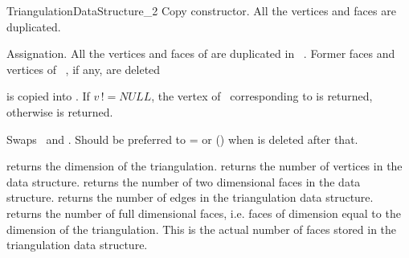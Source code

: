 \begin{ccRefConcept}{TriangulationDataStructure_2}
{Copy constructor. All the vertices and faces are duplicated.}

{Assignation. All the vertices and faces of  are duplicated
in \ccVar\ . Former faces and vertices of \ccVar\ , if any, are
deleted}


{ is copied into \ccVar. If $v\, !\!= NULL$, the vertex of \ccVar\ 
corresponding to  is returned, otherwise  
is returned.
}

{Swaps \ccVar\ and . Should be preferred to \ccVar= or \ccVar(\ccc{tds1})
when \ccc{tds1} is deleted after that.}

\ccAccessFunctions
{}
{returns the dimension of the triangulation.}
\ccGlue
{}
{returns the number of vertices in the data structure.}
\ccGlue
{}
{returns the number of two dimensional faces in the data structure.}
\ccGlue
{}
{returns the number of edges  in the triangulation data structure.}
\ccGlue
{}
{returns the  number of full dimensional faces, 
i.e. faces of dimension equal to the dimension
of the triangulation. This is the actual
number of faces stored in the triangulation data structure.}

\begin{ccAdvanced}
\end{ccAdvanced}



\end{ccRefConcept}
